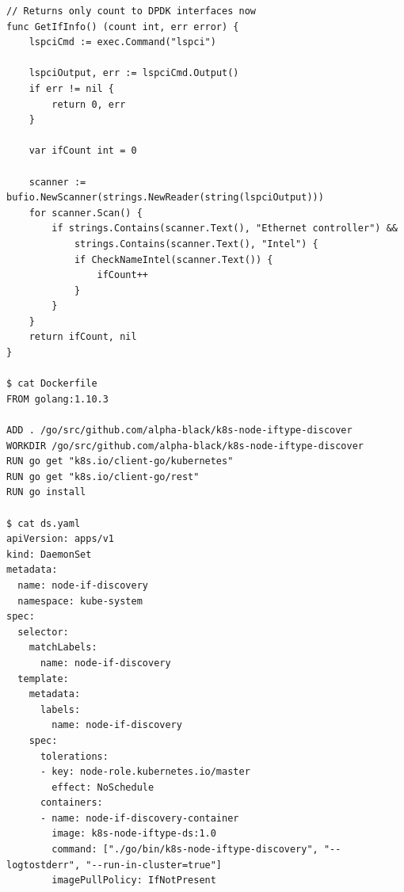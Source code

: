 \documentclass[english, 12pt, a4paper, elec, utf8, a-1b, online]{aaltothesis}
\begin{document}
\begin{lstlisting}[basicstyle={\small\ttfamily}]
// Returns only count to DPDK interfaces now
func GetIfInfo() (count int, err error) {
    lspciCmd := exec.Command("lspci")

    lspciOutput, err := lspciCmd.Output()
    if err != nil {
        return 0, err
    }

    var ifCount int = 0

    scanner := bufio.NewScanner(strings.NewReader(string(lspciOutput)))
    for scanner.Scan() {
        if strings.Contains(scanner.Text(), "Ethernet controller") &&
            strings.Contains(scanner.Text(), "Intel") {
            if CheckNameIntel(scanner.Text()) {
                ifCount++
            }
        }
    }
    return ifCount, nil
}

$ cat Dockerfile 
FROM golang:1.10.3

ADD . /go/src/github.com/alpha-black/k8s-node-iftype-discover
WORKDIR /go/src/github.com/alpha-black/k8s-node-iftype-discover
RUN go get "k8s.io/client-go/kubernetes"
RUN go get "k8s.io/client-go/rest"
RUN go install

$ cat ds.yaml 
apiVersion: apps/v1
kind: DaemonSet
metadata:
  name: node-if-discovery
  namespace: kube-system
spec:
  selector:
    matchLabels:
      name: node-if-discovery
  template:
    metadata:
      labels:
        name: node-if-discovery
    spec:
      tolerations:
      - key: node-role.kubernetes.io/master
        effect: NoSchedule
      containers:
      - name: node-if-discovery-container
        image: k8s-node-iftype-ds:1.0
        command: ["./go/bin/k8s-node-iftype-discovery", "--logtostderr", "--run-in-cluster=true"]
        imagePullPolicy: IfNotPresent

\end{lstlisting}
\end{document}
